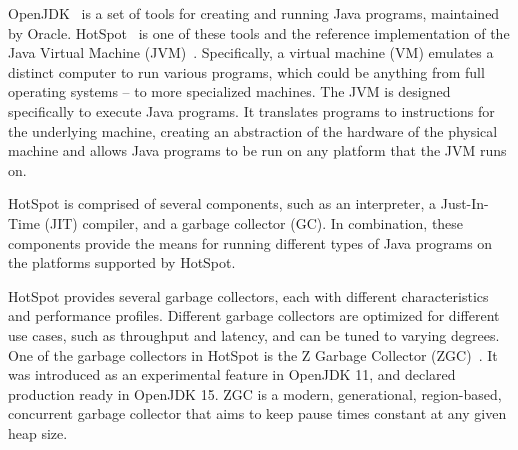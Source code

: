 
OpenJDK~\cite{openjdk} is a set of tools for creating and running Java programs, maintained by Oracle. HotSpot~\cite{hotspot} is one of these tools and the reference implementation of the Java Virtual Machine (JVM)~\cite{JVM}. Specifically, a virtual machine (VM) emulates a distinct computer to run various programs, which could be anything from full operating systems -- to more specialized machines. The JVM is designed specifically to execute Java programs. It translates programs to instructions for the underlying machine, creating an abstraction of the hardware of the physical machine and allows Java programs to be run on any platform that the JVM runs on.

HotSpot is comprised of several components, such as an interpreter, a Just-In-Time (JIT) compiler, and a garbage collector (GC). In combination, these components provide the means for running different types of Java programs on the platforms supported by HotSpot.

HotSpot provides several garbage collectors, each with different characteristics and performance profiles. Different garbage collectors are optimized for different use cases, such as throughput and latency, and can be tuned to varying degrees. One of the garbage collectors in HotSpot is the Z Garbage Collector (ZGC)~\cite{zgc}. It was introduced as an experimental feature in OpenJDK 11, and declared production ready in OpenJDK 15. ZGC is a modern, generational, region-based, concurrent garbage collector that aims to keep pause times constant at any given heap size.


